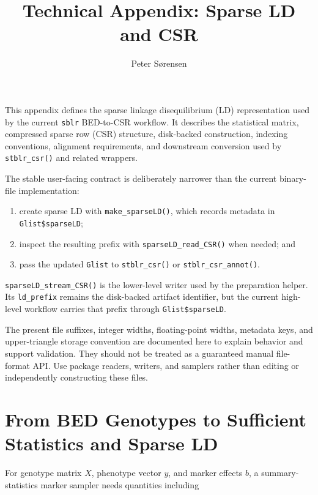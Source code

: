\documentclass[
  11pt,
  letterpaper,
  DIV=11,
  numbers=noendperiod]{scrartcl}
\title{Technical Appendix: Sparse LD and CSR}
\author{Peter Sørensen}
\date{}
\providecommand{\tightlist}{%
  \setlength{\itemsep}{0pt}\setlength{\parskip}{0pt}}
\renewcommand*\contentsname{Table of contents}
\newcommand\contentsname{Table of contents}
\begin{document}
\maketitle

\renewcommand*\contentsname{Table of contents}
{
\hypersetup{linkcolor=}
\setcounter{tocdepth}{3}
\tableofcontents
}

This appendix defines the sparse linkage disequilibrium (LD)
representation used by the current \texttt{sblr} BED-to-CSR workflow. It
describes the statistical matrix, compressed sparse row (CSR) structure,
disk-backed construction, indexing conventions, alignment requirements,
and downstream conversion used by \texttt{stblr\_csr()} and related
wrappers.

The stable user-facing contract is deliberately narrower than the
current binary-file implementation:

\begin{enumerate}
\def\labelenumi{\arabic{enumi}.}
\tightlist
\item
  create sparse LD with \texttt{make\_sparseLD()}, which records
  metadata in \texttt{Glist\$sparseLD};
\item
  inspect the resulting prefix with \texttt{sparseLD\_read\_CSR()} when
  needed; and
\item
  pass the updated \texttt{Glist} to \texttt{stblr\_csr()} or
  \texttt{stblr\_csr\_annot()}.
\end{enumerate}

\texttt{sparseLD\_stream\_CSR()} is the lower-level writer used by the
preparation helper. Its \texttt{ld\_prefix} remains the disk-backed
artifact identifier, but the current high-level workflow carries that
prefix through \texttt{Glist\$sparseLD}.

The present file suffixes, integer widths, floating-point widths,
metadata keys, and upper-triangle storage convention are documented here
to explain behavior and support validation. They should not be treated
as a guaranteed manual file-format API. Use package readers, writers,
and samplers rather than editing or independently constructing these
files.

\section{From BED Genotypes to Sufficient Statistics and Sparse
LD}\label{from-bed-genotypes-to-sufficient-statistics-and-sparse-ld}

For genotype matrix \(X\), phenotype vector \(y\), and marker effects
\(b\), a summary-statistics marker sampler needs quantities including
\end{document}
